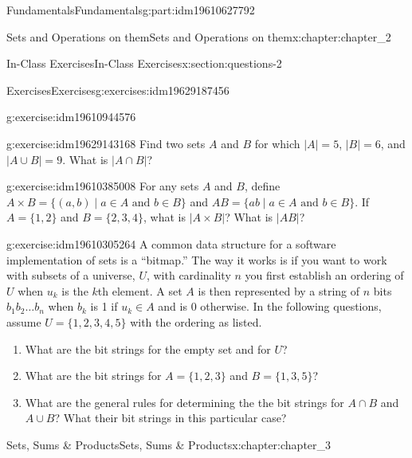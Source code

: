 \documentclass[oneside,10pt,]{book}
\numberwithin{equation}{section}
\begin{document}
\begin{partptx}{Fundamentals}{}{Fundamentals}{}{}{g:part:idm19610627792}
\begin{chapterptx}{Sets and Operations on them}{}{Sets and Operations on them}{}{}{x:chapter:chapter_2}
\begin{sectionptx}{In-Class Exercises}{}{In-Class Exercises}{}{}{x:section:questions-2}
\begin{exercises-subsection-numberless}{Exercises}{}{Exercises}{}{}{g:exercises:idm19629187456}
\begin{exercisegroup}
\begin{divisionexerciseeg}{3}{}{}{g:exercise:idm19610944576}
\begin{enumerate}[label=(\alph*)]
\end{enumerate}
%
\end{divisionexerciseeg}%
\begin{divisionexerciseeg}{4}{}{}{g:exercise:idm19629143168}%
Find two sets \(A\) and \(B\) for which \(|A| = 5\), \(|B| = 6\), and \(|A\cup B| = 9\). What is \(|A \cap B|\)?%
\end{divisionexerciseeg}%
\begin{divisionexerciseeg}{5}{}{}{g:exercise:idm19610385008}%
For any sets \(A\) and \(B\), define \(A\times B = \{(a,b) \mid a\in A \text{ and } b \in B\}\) and \(AB = \{ab \mid a\in A \text{ and } b \in B\}\). If \(A = \{1,2\}\) and \(B = \{2,3,4\}\),  what is \(|A \times B|\)? What is \(|AB|\)?%
\end{divisionexerciseeg}%
\begin{divisionexerciseeg}{6}{}{}{g:exercise:idm19610305264}%
A common data structure for a software implementation of sets is a ``bitmap.''  The way it works is if you want to work with subsets of a universe, \(U\), with cardinality \(n\) you first establish an ordering of \(U\) when \(u_k\) is the \(k\)th element.  A set \(A\) is then represented by a string of \(n\) bits  \(b_1b_2\dots b_n\) when \(b_k\) is 1 if \(u_k \in A\) and is 0 otherwise. In the following questions, assume \(U=\{1,2,3,4,5\}\) with the ordering as listed.%
\begin{enumerate}[label=(\alph*)]
\item{}What are the bit strings for the empty set and for \(U\)?%
\item{}What are the bit strings for \(A=\{1,2,3\}\) and \(B=\{1,3,5\}\)?%
\item{}What are the general rules for determining the the bit strings for \(A\cap B\) and \(A \cup B\)?  What their bit strings in this particular case?%
\end{enumerate}
%
\end{divisionexerciseeg}%
\end{exercisegroup}
\par\medskip\noindent
\end{exercises-subsection-numberless}
\end{sectionptx}
\end{chapterptx}
%
\typeout{************************************************}
\typeout{************************************************}
%
\begin{chapterptx}{Sets, Sums \& Products}{}{Sets, Sums \& Products}{}{}{x:chapter:chapter_3}

\end{chapterptx}
\end{partptx}
\end{document}
